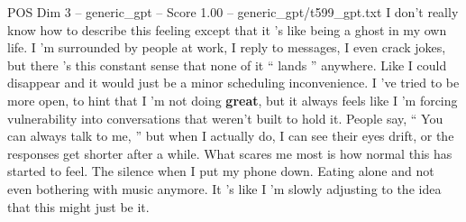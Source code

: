 \begin{textsample}{POS Dim 3 – generic\_gpt – Score 1.00 – generic\_gpt/t599\_gpt.txt}  \label{ex:f3_pos_036}
I don't really know how to describe this feeling except that it ’s like being a ghost in my own life.
I ’m surrounded by people at work, I reply to messages, I even crack jokes, but there ’s this constant sense that none of it “ lands ” anywhere.
Like I could disappear and it would just be a minor scheduling inconvenience.
I ’ve tried to be more open, to hint that I ’m not doing \textbf{great}, but it always feels like I ’m forcing vulnerability into conversations that weren't built to hold it.
People say, “ You can always talk to me, ” but when I actually do, I can see their eyes drift, or the responses get shorter after a while.
What scares me most is how normal this has started to feel.
The silence when I put my phone down.
Eating alone and not even bothering with music anymore.
It ’s like I ’m slowly adjusting to the idea that this might just be it.

\end{textsample}
